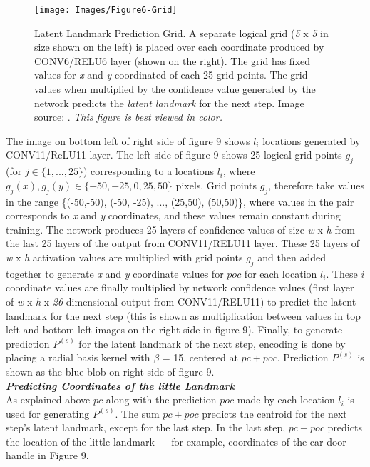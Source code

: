 \documentclass [11pt,letterpaper ,openany ]{report}
\begin{document}
    \begin{figure}[t]
      \centering
      \texttt{[image: Images/Figure6-Grid]}
      \caption{Latent Landmark Prediction Grid. A separate logical grid (\textit{5} x \textit{5} in size shown on the left) is placed over each coordinate produced by CONV6/RELU6 layer (shown on the right). The grid has fixed values for \textit{x} and \textit{y} coordinated of each 25 grid points. The grid values when multiplied by the confidence value generated by the network predicts the \textit{latent landmark} for the next step. Image source: \cite{Singh_2016_CVPR}. \textit{This figure is best viewed in color.}}
      \label{fig:grid}
    \end{figure}

    The image on bottom left of right side of figure 9 shows \(l_i\) locations generated by CONV11/ReLU11 layer. The left side of figure 9 shows 25 logical grid points \(g_j\) (for \(j \in \{ 1,...,25 \} \)) corresponding to a locations \(l_i\), where \(g_j(x), g_j(y) \in \{-50, -25, 0, 25, 50\} \) pixels. Grid points \(g_j\), therefore take values in the range \{(-50,-50), (-50, -25), ..., (25,50), (50,50)\}, where values in the pair corresponds to \textit{x} and \textit{y} coordinates, and these values remain constant during training. The network produces 25 layers of confidence values of size \textit {w} x \textit {h} from the last 25 layers of the output from CONV11/RELU11 layer. These 25 layers of \textit {w} x \textit {h} activation values are multiplied with grid points \(g_j\) and then added together to generate \textit{x} and \textit{y} coordinate values for \( poc \) for each location \(l_i\). These \(i\) coordinate values are finally multiplied by network confidence values (first layer of \textit {w} x \textit {h} x \textit {26} dimensional output from CONV11/RELU11) to predict the latent landmark for the next step (this is shown as multiplication between values in top left and bottom left images on the right side in figure 9).  Finally, to generate prediction \(P^{(s)} \) for the latent landmark of the next step, encoding is done by placing a radial basis kernel with \(\beta \) = 15, centered at \( pc + poc \). Prediction \(P^{(s)} \) is shown as the blue blob on right side of figure 9.\\

    \noindent
    \textbf{\textit{Predicting Coordinates of the little Landmark}}\\
    As explained above \(pc \) along with the prediction \(poc\) made by each location \(l_i\) is used for generating \(P^{(s)}\). The sum \(pc + poc\) predicts the centroid for the next step's latent landmark, except for the last step. In the last step, \(pc + poc\) predicts the location of the little landmark --- for example, coordinates of the car door handle in Figure 9.\\\\
\end{document}
